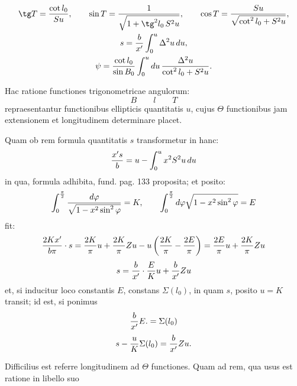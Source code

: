 \begingroup\small
\[
\begin{gathered}
 \tg T={\cot l_0\over Su},\qquad
 \sin T={1\over \sqrt{1+\tg^2l_0\,S^2u}},\qquad
 \cos T={Su\over \sqrt{\cot^2l_0+S^2u}},\\
 s={b\over x'}\int_0^u \Delta^2u\,du,\\
 \psi={\cot l_0\over \sin B_0}\int_0^u du\,{\Delta^2u\over \cot^2l_0+S^2u}.
\end{gathered}
\]


Hac ratione functiones trigonometricae angulorum:
\[
 B\qquad l\qquad T
\]
repraesentantur functionibus ellipticis quantitatis $u$, cujus $\Theta$ functionibus jam extensionem et longitudinem determinare placet.

Quam ob rem formula quantitatis $s$ transformetur in hanc:
\[
 {x's\over b}=u-\int_0^u x^2S^2u\,du
\]
in qua, formula adhibita, fund. pag. 133 proposita; et posito:
\[
 \int_0^{\frac{\pi}{2}}{d\varphi\over \sqrt{1-x^2\sin^2\varphi}}=K,
 \qquad
 \int_0^{\frac{\pi}{2}}d\varphi\sqrt{1-x^2\sin^2\varphi}=E
\]
fit:
\[
 {2Kx'\over b\pi}\cdot s={2K\over\pi}u+{2K\over\pi}Zu-u\left({2K\over\pi}-{2E\over\pi}\right)
 ={2E\over\pi}u+{2K\over\pi}Zu
\]
\[
 s={b\over x'}\cdot {E\over K}u+{b\over x'}Zu
\]
et, si inducitur loco constantis $E$, constans $\Sigma(l_0)$, in quam $s$, posito $u=K$ transit; id est, si ponimus
\[
 {b\over x'}E. = \Sigma(l_0)
\]
\[
 s-{u\over K}\Sigma(l_0)={b\over x'}Zu.
\]


Difficilius est referre longitudinem ad $\Theta$ functiones. Quam ad rem, qua usus est ratione in libello suo
\endgroup

